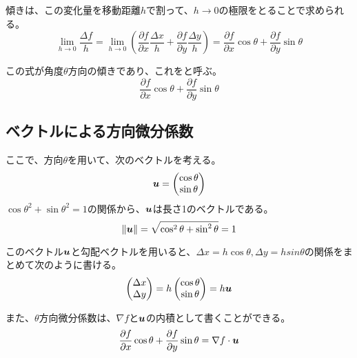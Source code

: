 \documentclass[../../../topic_calculus]{subfiles}
\begin{document}
\br

傾きは、この変化量を移動距離$h$で割って、$h \to 0$の極限をとることで求められる。
\begin{equation*}
  \lim_{h \to 0} \frac{\Delta f}{h}
= \lim_{h \to 0} \left( \frac{\partial f}{\partial x}\frac{\Delta x}{h} + \frac{\partial f}{\partial y}\frac{\Delta y}{h} \right)
= \frac{\partial f}{\partial x}\cos \theta + \frac{\partial f}{\partial y}\sin \theta
\end{equation*}

\br

この式が角度$\theta$方向の傾きであり、これをと呼ぶ。
\begin{equation*}
  \frac{\partial f}{\partial x}\cos \theta + \frac{\partial f}{\partial y}\sin \theta
\end{equation*}

\subsection{ベクトルによる方向微分係数}

ここで、方向$\theta$を用いて、次のベクトルを考える。
\begin{equation*}
  \vb*{u} = \begin{pmatrix} \cos \theta \\ \sin \theta \end{pmatrix}
\end{equation*}
$\cos \theta^2 + \sin \theta^2 = 1$の関係から、$\vb*{u}$は長さ1のベクトルである。
\begin{equation*}
  \| \vb*{u} \| = \sqrt{\cos^2 \theta + \sin^2 \theta} = 1
\end{equation*}

\br

このベクトル$\vb*{u}$と勾配ベクトルを用いると、$\Delta x = h \cos \theta ,\Delta y = h sin \theta$の関係をまとめて次のように書ける。
\begin{equation*}
  \begin{pmatrix} \Delta x \\ \Delta y \end{pmatrix} = h \begin{pmatrix} \cos \theta \\ \sin \theta \end{pmatrix} = h \vb*{u}
\end{equation*}

\br

また、$\theta$方向微分係数は、$\nabla f$と$\vb*{u}$の内積として書くことができる。
\begin{equation*}
  \frac{\partial f}{\partial x}\cos \theta + \frac{\partial f}{\partial y}\sin \theta
= \nabla f \cdot \vb*{u}
\end{equation*}
\end{document}
